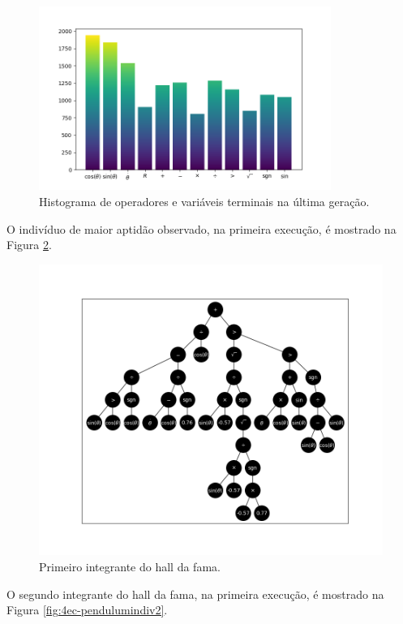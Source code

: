 \begin{figure}[H]
	\centering
	\includegraphics[width=0.85\textwidth]{02_desenvolvimento/04_EC_Fig_PendulumOper.png}
	\caption{Histograma de operadores e variáveis terminais na última geração.}
	\label{fig:4ec-pendulumoper}
\end{figure}

O indivíduo de maior aptidão observado, na primeira execução, é mostrado na Figura \ref{fig:4ec-pendulumindiv1}.

\begin{figure}[H]
	\centering
	\includegraphics[width=\textwidth]{02_desenvolvimento/04_EC_Fig_PendulumIndiv1.png}
	\caption{Primeiro integrante do hall da fama.}
	\label{fig:4ec-pendulumindiv1}
\end{figure}

O segundo integrante do hall da fama, na primeira execução, é mostrado na Figura \ref{fig:4ec-pendulumindiv2}.

